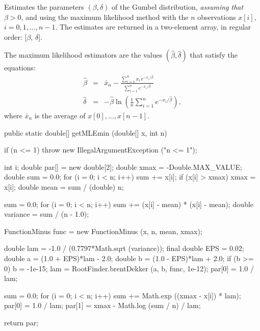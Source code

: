\begin{tabb}
   Estimates the parameters $(\beta,\delta)$ of the Gumbel distribution,
   \emph{assuming that $\beta > 0$}, and
   using the maximum likelihood method with the $n$ observations
   $x[i]$, $i = 0, 1,\ldots, n-1$. The estimates are returned in a two-element
    array, in regular order: [$\beta$, $\delta$].
   \begin{detailed}
   The maximum likelihood estimators are the values $(\hat\beta, \hat\delta)$
   that satisfy the equations:
   \begin{eqnarray*}
      \hat\beta & = & \bar{x}_n - \frac{\sum_{i=1}^{n} x_i\,
   e^{- x_i/\hat{\beta}}}{\sum_{i=1}^{n} e^{- x_i / \hat{\beta}}}\\[0.5em]
      \hat{\delta} & = & -{\hat{\beta}} \ln \left( \frac{1}{n}
    \sum_{i=1}^{n} e^{-x_i/\hat{\beta}} \right),
   \end{eqnarray*}
   where $\bar x_n$ is the average of $x[0],\dots,x[n-1]$.
   \end{detailed}
\end{tabb}
\begin{htmlonly}
\end{htmlonly}
\begin{code}

   public static double[] getMLEmin (double[] x, int n)\begin{hide} {
      if (n <= 1)
         throw new IllegalArgumentException ("n <= 1");

      int i;
      double par[] = new double[2];
      double xmax = -Double.MAX_VALUE;
      double sum = 0.0;
      for (i = 0; i < n; i++) {
         sum += x[i];
         if (x[i] > xmax)
            xmax = x[i];
      }
      double mean = sum / (double) n;

      sum = 0.0;
      for (i = 0; i < n; i++)
         sum += (x[i] - mean) * (x[i] - mean);
      double variance = sum / (n - 1.0);

      FunctionMinus func = new FunctionMinus (x, n, mean, xmax);

      double lam = -1.0 / (0.7797*Math.sqrt (variance));
      final double EPS = 0.02;
      double a = (1.0 + EPS)*lam - 2.0;
      double b = (1.0 - EPS)*lam + 2.0;
      if (b >= 0)
         b = -1e-15;
      lam = RootFinder.brentDekker (a, b, func, 1e-12);
      par[0] = 1.0 / lam;

      sum = 0.0;
      for (i = 0; i < n; i++)
         sum += Math.exp ((xmax - x[i]) * lam);
      par[0] = 1.0 / lam;
      par[1] = xmax - Math.log (sum / n) / lam;

      return par;
   }\end{hide}
\end{code}
